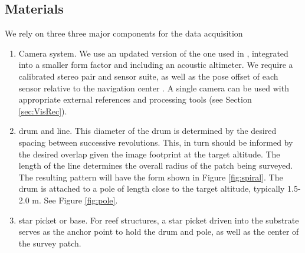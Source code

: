 
\subsection{Materials}
We rely on three three major components for the data acquisition
\begin{enumerate}
\item Camera system. We use an updated version of the one used in \cite{Henderson_2013} \cite{Camilli_2007}, integrated into a smaller form factor and including an acoustic altimeter. We require a calibrated stereo pair and sensor suite, as well as the pose offset of each sensor relative to the navigation center \cite{Johnson_Roberson_2013} \cite{Mahon_2008}. A single camera can be used with appropriate external references and processing tools (see Section \ref{sec:VisRec}).
\item drum and line. This diameter of the drum is determined by the desired spacing between successive revolutions. This, in turn should be informed by the desired overlap given the image footprint at the target altitude. The length of the line determines the overall radius of the patch being surveyed. The resulting pattern will have the form shown in Figure \ref{fig:spiral}. The drum is attached to a pole of length close to the target altitude, typically 1.5-2.0 m. See Figure \ref{fig:pole}.




\item star picket or base. For reef structures, a star picket driven into the substrate serves as the anchor point to hold the drum and pole, as well as the center of the survey patch.

\end{enumerate}


  